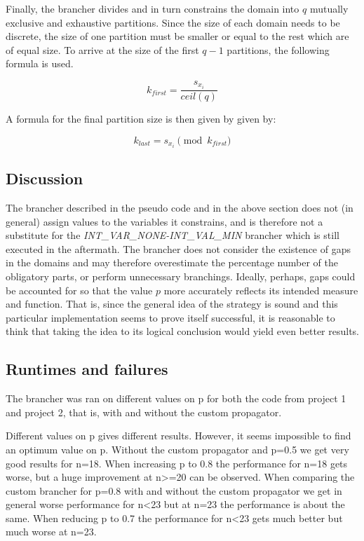 \documentclass[a4paper,11pt]{article}
\begin{document}
Finally, the brancher divides and in turn constrains the domain into $q$ mutually exclusive and exhaustive partitions. Since the size of each domain needs to be discrete, the size of one partition must be smaller or equal to the rest which are of equal size. To arrive at the size of the first $q-1$ partitions, the following formula is used.

\begin{equation}
k_{first} = \frac{s_{x_i}}{ceil(q)} 
\end{equation}

A formula for the final partition size is then given by given by:

\begin{equation}
k_{last} = s_{x_i} \pmod{k_{first}}
\end{equation}

\subsection{Discussion}

The brancher described in the pseudo code and in the above section does not (in general) assign values to the variables it constrains, and is therefore not a substitute for the \emph{INT\_VAR\_NONE-INT\_VAL\_MIN} brancher which is still executed in the aftermath. The brancher does not consider the existence of gaps in the domains and may therefore overestimate the percentage number of the  obligatory parts, or perform unnecessary branchings. Ideally, perhaps, gaps could be accounted for so that the value $p$ more accurately reflects its intended measure and function. That is, since the general idea of the strategy is sound and this particular implementation seems to prove itself successful, it is reasonable to think that taking the idea to its logical conclusion would yield even better results.


\subsection{Runtimes and failures}

The brancher was ran on different values on p for both the code from project 1 and project 2, that is, with and without the custom propagator.

Different values on p gives different results. However, it seems impossible to find an optimum value on p. Without the custom propagator and p=0.5 we get very good results for n=18. When increasing p to 0.8 the performance for n=18 gets worse, but a huge improvement at n>=20 can be observed. When comparing the custom brancher for p=0.8 with and without the custom propagator we get in general worse performance for n<23 but at n=23 the performance is about the same. When reducing p to 0.7 the performance for n<23 gets much better but much worse at n=23.
\end{document}
